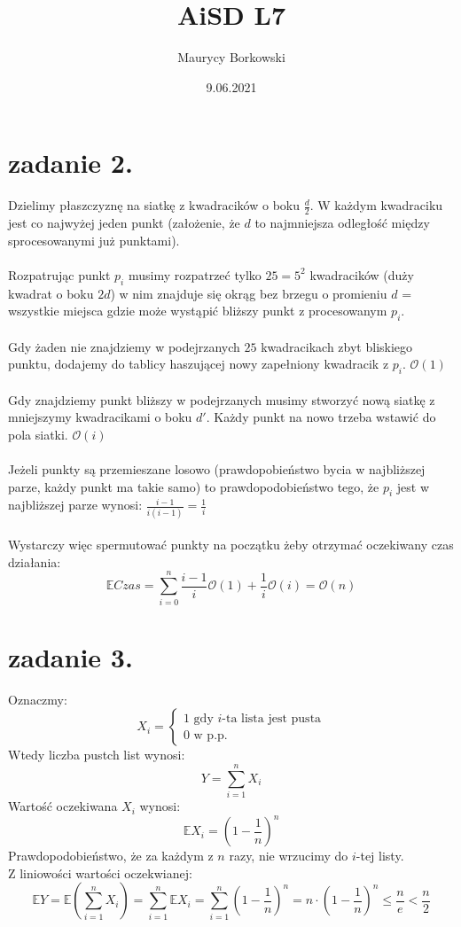 \documentclass{article}
\title{AiSD L7}
\date{9.06.2021}
\author{Maurycy Borkowski}
\begin{document}
\maketitle
\section{zadanie 2.}
Dzielimy płaszczyznę na siatkę z kwadracików o boku $\frac d 2$. W każdym kwadraciku jest co najwyżej jeden punkt (założenie, że $d$ to najmniejsza odległość między sprocesowanymi już punktami).\\\\
Rozpatrując punkt $p_i$ musimy rozpatrzeć tylko $25 = 5^2$ kwadracików (duży kwadrat o boku $2d$) w nim znajduje się okrąg bez brzegu o promieniu $d$ = wszystkie miejsca gdzie może wystąpić bliższy punkt z procesowanym $p_i$.\\\\
Gdy żaden nie znajdziemy w podejrzanych $25$ kwadracikach zbyt bliskiego punktu, dodajemy do tablicy haszującej nowy zapełniony kwadracik z $p_i$. $\mathcal{O}(1)$\\\\
Gdy znajdziemy punkt bliższy w podejrzanych musimy stworzyć nową siatkę z mniejszymy kwadracikami o boku $d'$. Każdy punkt na nowo trzeba wstawić do pola siatki. $\mathcal{O}(i)$\\\\
Jeżeli punkty są przemieszane losowo (prawdopobieństwo bycia w najbliższej parze, każdy punkt ma takie samo) to prawdopodobieństwo tego, że $p_i$ jest w najbliższej parze wynosi: $\frac{i-1}{i(i-1)} = \frac{1}{i}$\\\\
Wystarczy więc spermutować punkty na początku żeby otrzymać oczekiwany czas działania:
$$
\mathbb{E}Czas = \sum_{i=0}^{n} \frac{i-1}{i}\mathcal{O}(1) + \frac{1}{i}\mathcal{O}(i) = \mathcal{O}(n)
$$

\clearpage
\section{zadanie 3.}
Oznaczmy:
$$
X_i=
\begin{cases}
1 \text{ gdy $i$-ta lista jest pusta}\\
0 \text{ w p.p.}
\end{cases}
$$
Wtedy liczba pustch list wynosi:
$$
Y = \sum_{i=1}^{n}X_i
$$
Wartość oczekiwana $X_i$ wynosi:
$$
\mathbb{E}X_i = \left(1-\frac{1}{n} \right)^n
$$
Prawdopodobieństwo, że za każdym z $n$ razy, nie wrzucimy do $i$-tej listy.\\
Z liniowości wartości oczekwianej:
$$
\mathbb{E}Y = \mathbb{E}\left(\sum_{i=1}^{n}X_i \right) = \sum_{i=1}^{n}\mathbb{E}X_i = \sum_{i=1}^{n} \left(1-\frac{1}{n} \right)^n= n \cdot \left(1-\frac{1}{n} \right)^n \leq \frac{n}{e} < \frac{n}{2}
$$
\end{document}
